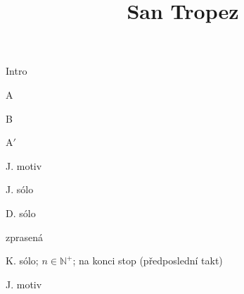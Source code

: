 \documentclass[timestamp]{jazzgrid}
\title{San Tropez}
\begin{document}
\maketitle

\begin{musicsection}{Intro}
	{}
	{\barfour{}{}{}{}{}}
\end{musicsection}

\begin{musicsection}{A}
\barline
	{}
	{\barfour{}{}{}{}{}}
	{}
	{\barfour{}{}{}{}{}}
\barline
	{}
	{\barfour{}{}{}{}{}}
	{}
	{\barfour{}{}{}{}{}}
\end{musicsection}

\begin{musicsection}{B}
\barline
	{}
	{\barfour{}{}{}{}{}}
	{}
	{\barfour{}{}{}{}{}}
\barline
	{}
	{\barfour{}{}{}{}{}}
	{}
	{\barfour{}{}{}{}{}}
\end{musicsection}

\begin{musicsection}{A$'$}
	{}
	{\barfour{}{}{}{}{}}
	{\barfour{}{}{}{}{}}
	{}
	{\barfour{}{}{}{}{}}
\barline
	{}
	{\barfour{}{}{}{}{}}
	{\barfour{}{}{}{}{}}
	{\barfour{}{}{}{}{}}
	{}
	{\barfour{}{}{}{}{}}
\end{musicsection}

\begin{description}[noitemsep,align=right,labelwidth=\widthof{\scriptsize\bfseries{ABAB}}]
	\scriptsize
	\item [Intro]
	\item [ABAB] J. motiv
	\item [AAB] J. sólo
	\item [AAB] D. sólo
	\item [A$'$B] zprasená
	\item [{$[$A$]_n$B}] K. sólo; $n \in \mathbb{N}^+$; na konci stop (předposlední takt)
	\item [A$'$B] J. motiv
\end{description}
\end{document}
